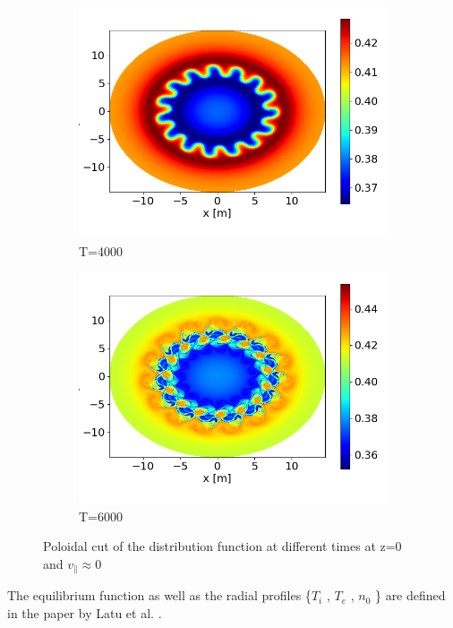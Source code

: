 \begin{figure}[ht]
 \begin{subfigure}[t]{.5\textwidth}
  \includegraphics[width=\textwidth]{Figs/SimResults/t4000}
  \caption{T=4000}
 \end{subfigure}
 \begin{subfigure}[t]{.5\textwidth}
  \includegraphics[width=\textwidth]{Figs/SimResults/t6000}
  \caption{T=6000}
 \end{subfigure}
 \caption{\label{fig::poloidal slice} Poloidal cut of the distribution function at different times at z=0 and $v_\parallel\approx0$}
\end{figure}

The equilibrium function as well as the radial profiles \{$T_i$ , $T_e$ , $n_0$ \} are defined in the paper by Latu et al. \cite{YamanPaper}.

